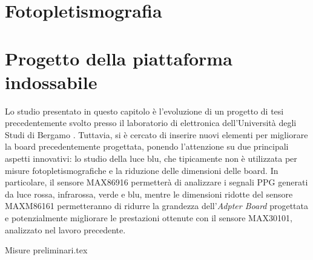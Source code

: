 \documentclass[
	a4paper,
	cleardoublepage=empty,
	headings=twolinechapter,
	numbers=autoenddot,
]{scrbook}
\begin{document}
	\chapter{Fotopletismografia}
	
	\chapter{Progetto della piattaforma indossabile}
	Lo studio presentato in questo capitolo è l'evoluzione di un progetto di tesi precedentemente svolto presso il laboratorio di elettronica dell’Università degli Studi di Bergamo \cite{Ingegneria2018}. Tuttavia, si è cercato di inserire nuovi elementi per migliorare la board precedentemente progettata, ponendo l'attenzione su due principali aspetti innovativi: lo studio della luce blu, che tipicamente non è utilizzata per misure fotopletismografiche e la riduzione delle dimensioni delle board. In particolare, il sensore MAX86916 permetterà di analizzare i segnali PPG generati da luce rossa, infrarossa, verde e blu, mentre le dimensioni ridotte del sensore MAXM86161 permetteranno di ridurre la grandezza dell'\textit{Adpter Board} progettata e potenzialmente migliorare le prestazioni ottenute con il sensore MAX30101, analizzato nel lavoro precedente\cite{Ingegneria2018}.
	
	{Misure preliminari.tex}
	
\end{document}
